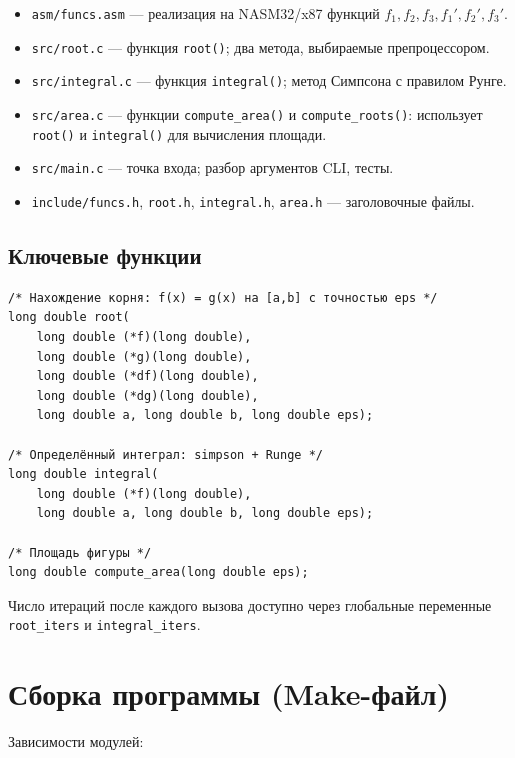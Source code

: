 \documentclass[a4paper,12pt,titlepage,finall]{article}
\begin{document}
\begin{itemize}
    \item \texttt{asm/funcs.asm} — реализация на NASM32/x87
          функций $f_1,f_2,f_3,f_1',f_2',f_3'$.
    \item \texttt{src/root.c} — функция \texttt{root()}; два метода,
          выбираемые препроцессором.
    \item \texttt{src/integral.c} — функция \texttt{integral()};
          метод Симпсона с правилом Рунге.
    \item \texttt{src/area.c} — функции \texttt{compute\_area()} и
          \texttt{compute\_roots()}: использует \texttt{root()} и
          \texttt{integral()} для вычисления площади.
    \item \texttt{src/main.c} — точка входа; разбор аргументов CLI,
          тесты.
    \item \texttt{include/funcs.h}, \texttt{root.h},
          \texttt{integral.h}, \texttt{area.h} — заголовочные файлы.
\end{itemize}

\subsection{Ключевые функции}

\begin{lstlisting}
/* Нахождение корня: f(x) = g(x) на [a,b] с точностью eps */
long double root(
    long double (*f)(long double),
    long double (*g)(long double),
    long double (*df)(long double),
    long double (*dg)(long double),
    long double a, long double b, long double eps);

/* Определённый интеграл: simpson + Runge */
long double integral(
    long double (*f)(long double),
    long double a, long double b, long double eps);

/* Площадь фигуры */
long double compute_area(long double eps);
\end{lstlisting}

Число итераций после каждого вызова доступно через глобальные
переменные \texttt{root\_iters} и \texttt{integral\_iters}.

\newpage

\section{Сборка программы (Make-файл)}

Зависимости модулей:
\end{document}
